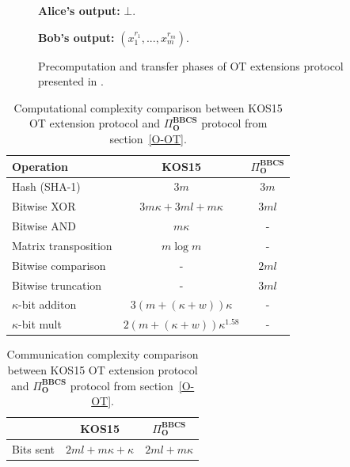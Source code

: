 \begin{figure}
\begin{tcolorbox}
    \textbf{Alice's output:} $\bot$.
    
    \textbf{Bob's output:} $(x^{r_1}_1, ..., x^{r_m}_m)$.

        
        \end{tcolorbox}
    \caption{Precomputation and transfer phases of OT extensions protocol presented in \cite{KOS15}.}
    \label{fig:K15Protocol}
\end{figure}

\begin{table}
\centering
\begin{tabular}{lcc}
\toprule
Operation & KOS15 & $\Pi^{\textbf{BBCS}}_{\textbf{O}}$ \\
\midrule
Hash (SHA-1)    & $3m$              & $3m$ \\ 
Bitwise XOR      & $3 m\kappa + 3ml + m\kappa$             & $3ml $  \\ 
Bitwise AND  & $m\kappa$              & -           \\ 
Matrix transposition & $m\log m$              & -           \\ 
Bitwise comparison & -             & $2ml$           \\ 
Bitwise truncation & -            & $3ml$           \\ 
$\kappa$-bit additon & $3(m + (\kappa + w))\kappa$ & - \\ 
$\kappa$-bit mult & $2(m + (\kappa + w))\kappa^{1.58}$ & - \\ 
\bottomrule
\end{tabular}
\caption{Computational complexity comparison between KOS15 \cite{KOS15} OT extension protocol and $\Pi^{\textbf{BBCS}}_{\textbf{O}}$ protocol from section~\ref{O-OT}.}
\label{table:complexity}
\end{table}

\begin{table}[h!]
\centering
\begin{tabular}{lcc}
\toprule
 & KOS15 & $\Pi^{\textbf{BBCS}}_{\textbf{O}}$  \\
\midrule
\multicolumn{1}{l}{Bits sent }   & $2ml  + m\kappa + \kappa$   & $2ml + m\kappa $  \\
\bottomrule
\end{tabular}
\caption{Communication complexity comparison between KOS15 \cite{KOS15} OT extension protocol and $\Pi^{\textbf{BBCS}}_{\textbf{O}}$ protocol from section~\ref{O-OT}.}
\label{table:communication}
\end{table}



